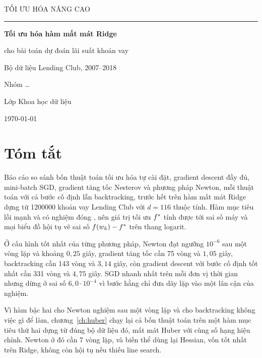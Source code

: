 \documentclass[12pt, a4paper, oneside]{report}
\theoremstyle{definition}
\begin{document}
\begin{titlepage}
  \centering
  \vspace*{2cm}
  {\sffamily\large\color{accent} TỐI ƯU HÓA NÂNG CAO\par}
  \vspace{0.6cm}
  {\color{accent}\rule{0.55\linewidth}{1.2pt}\par}
  \vspace{1.4cm}
  {\sffamily\Huge\bfseries Tối ưu hóa hàm mất mát Ridge\par}
  \vspace{0.5cm}
  {\sffamily\Large cho bài toán dự đoán lãi suất khoản vay\par}
  \vspace{0.8cm}
  {\large Bộ dữ liệu Lending Club, 2007--2018\par}
  \vfill
  {\large Nhóm \dots\par}
  {\large Lớp Khoa học dữ liệu\par}
  \vspace{1cm}
  {\large \today\par}
\end{titlepage}

\chapter*{Tóm tắt}

Báo cáo so sánh bốn thuật toán tối ưu hóa tự cài đặt, gradient descent đầy đủ,
mini-batch SGD, gradient tăng tốc Nesterov và phương pháp Newton, mỗi thuật toán
với cả bước cố định lẫn backtracking, trước hết trên hàm mất mát Ridge dựng từ
\num{1200000} khoản vay Lending Club với $d = 116$ thuộc tính. Hàm mục tiêu lồi
mạnh và có nghiệm đóng \cite{boyd2004convex}, nên giá trị tối ưu $f^{*}$ tính được tới sai số máy và
mọi biểu đồ hội tụ vẽ sai số $f(w_k) - f^{*}$ trên thang logarit.

Ở cấu hình tốt nhất của từng phương pháp, Newton đạt ngưỡng $10^{-6}$ sau một
vòng lặp và khoảng $0{,}25$ giây, gradient tăng tốc cần 75 vòng và $1{,}05$ giây,
backtracking cần 143 vòng và $3{,}14$ giây, còn gradient descent với bước cố định
tốt nhất cần 331 vòng và $4{,}75$ giây. SGD nhanh nhất trên mỗi đơn vị thời gian
nhưng dừng ở sai số $6{,}0 \cdot 10^{-4}$ vì bước hằng chỉ đưa dãy lặp vào một
lân cận của nghiệm.

Vì hàm bậc hai cho Newton nghiệm sau một vòng lặp và cho backtracking không việc
gì để làm, chương~\ref{ch:huber} chạy lại cả bốn thuật toán trên một hàm mục tiêu
thứ hai dựng từ đúng bộ dữ liệu đó, mất mát Huber với cùng số hạng hiệu chỉnh.
Newton ở đó cần 7 vòng lặp, và biến thể dùng lại Hessian, vốn tốt nhất trên Ridge,
không còn hội tụ nếu thiếu line search.
\end{document}
